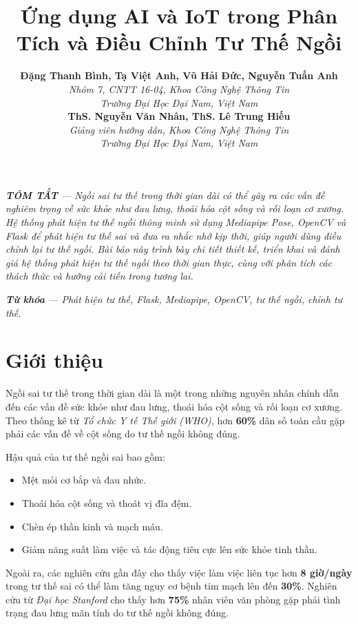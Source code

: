 \documentclass[journal,onecolumn]{IEEEtran}
\title{Ứng dụng AI và IoT trong Phân Tích và Điều Chỉnh Tư Thế Ngồi}
\author{
    \textbf{Đặng Thanh Bình, Tạ Việt Anh, Vũ Hải Đức, Nguyễn Tuấn Anh} \\
    \textit{Nhóm 7, CNTT 16-04, Khoa Công Nghệ Thông Tin} \\
    \textit{Trường Đại Học Đại Nam, Việt Nam} \\
    \textbf{ThS. Nguyễn Văn Nhân, ThS. Lê Trung Hiếu} \\
    \textit{Giảng viên hướng dẫn, Khoa Công Nghệ Thông Tin} \\
    \textit{Trường Đại Học Đại Nam, Việt Nam}
}
\begin{document}
\maketitle

\noindent\textit{\textbf{TÓM TẮT} --- Ngồi sai tư thế trong thời gian dài có thể gây ra các vấn đề nghiêm trọng về sức khỏe như đau lưng, thoái hóa cột sống và rối loạn cơ xương. Hệ thống phát hiện tư thế ngồi thông minh sử dụng Mediapipe Pose, OpenCV và Flask để phát hiện tư thế sai và đưa ra nhắc nhở kịp thời, giúp người dùng điều chỉnh lại tư thế ngồi. Bài báo này trình bày chi tiết thiết kế, triển khai và đánh giá hệ thống phát hiện tư thế ngồi theo thời gian thực, cùng với phân tích các thách thức và hướng cải tiến trong tương lai.}

\vspace{2mm} %

\noindent\textit{\textbf{Từ khóa} --- Phát hiện tư thế, Flask, Mediapipe, OpenCV, tư thế ngồi, chỉnh tư thế.}


\section{\textbf{Giới thiệu}}
Ngồi sai tư thế trong thời gian dài là một trong những nguyên nhân chính dẫn đến các vấn đề sức khỏe như đau lưng, thoái hóa cột sống và rối loạn cơ xương. Theo thống kê từ \textit{Tổ chức Y tế Thế giới (WHO)}, hơn \textbf{60\%} dân số toàn cầu gặp phải các vấn đề về cột sống do tư thế ngồi không đúng.  

Hậu quả của tư thế ngồi sai bao gồm:
\begin{itemize}
    \item Mệt mỏi cơ bắp và đau nhức.
    \item Thoái hóa cột sống và thoát vị đĩa đệm.
    \item Chèn ép thần kinh và mạch máu.
    \item Giảm năng suất làm việc và tác động tiêu cực lên sức khỏe tinh thần.
\end{itemize}

Ngoài ra, các nghiên cứu gần đây cho thấy việc làm việc liên tục hơn \textbf{8 giờ/ngày} trong tư thế sai có thể làm tăng nguy cơ bệnh tim mạch lên đến \textbf{30\%}. Nghiên cứu từ \textit{Đại học Stanford} cho thấy hơn \textbf{75\%} nhân viên văn phòng gặp phải tình trạng đau lưng mãn tính do tư thế ngồi không đúng.
\end{document}
